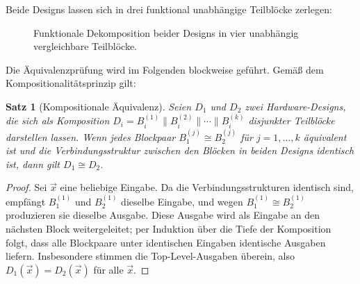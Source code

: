 ﻿\documentclass[12pt,a4paper]{report}
\newtheorem{theorem}{Satz}[section]
\begin{document}
Beide Designs lassen sich in drei funktional unabhängige Teilblöcke zerlegen:

\begin{figure}[H]
	\centering
	\caption{Funktionale Dekomposition beider Designs in vier unabhängig vergleichbare Teilblöcke.}
	\label{fig:dekomposition}
\end{figure}

Die Äquivalenzprüfung wird im Folgenden blockweise geführt.  Gemäß dem
Kompositionalitätsprinzip gilt:

\begin{theorem}[Kompositionale Äquivalenz]
	\label{thm:kompositional}
	Seien $D_1$ und $D_2$ zwei Hardware-Designs, die sich als Komposition
	$D_i = B_i^{(1)} \parallel B_i^{(2)} \parallel \cdots \parallel B_i^{(k)}$
	disjunkter Teilblöcke darstellen lassen.  Wenn jedes Blockpaar
	$B_1^{(j)} \cong B_2^{(j)}$ für $j = 1,\ldots,k$ äquivalent ist und die
	Verbindungsstruktur zwischen den Blöcken in beiden Designs identisch ist, dann
	gilt $D_1 \cong D_2$.
\end{theorem}

\begin{proof}
	Sei $\vec{x}$ eine beliebige Eingabe.  Da die Verbindungsstrukturen identisch
	sind, empfängt $B_1^{(1)}$ und $B_2^{(1)}$ dieselbe Eingabe, und wegen
	$B_1^{(1)} \cong B_2^{(1)}$ produzieren sie dieselbe Ausgabe.  Diese Ausgabe
	wird als Eingabe an den nächsten Block weitergeleitet; per Induktion über die
	Tiefe der Komposition folgt, dass alle Blockpaare unter identischen Eingaben
	identische Ausgaben liefern.  Insbesondere stimmen die Top-Level-Ausgaben
	überein, also $D_1(\vec{x}) = D_2(\vec{x})$ für alle $\vec{x}$.
\end{proof}
\end{document}
